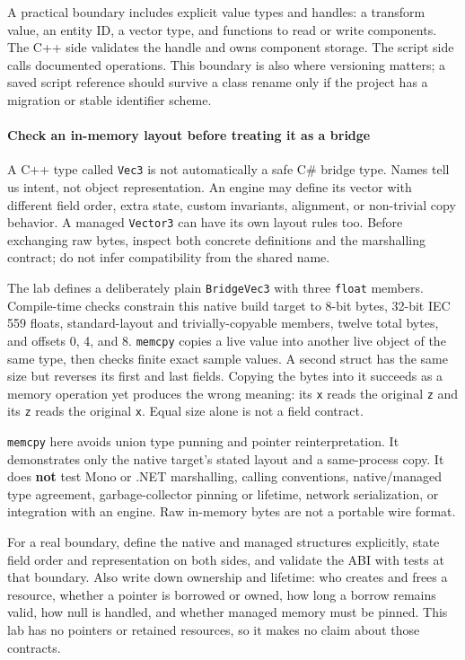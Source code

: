 A practical boundary includes explicit value types and handles: a transform value, an entity ID, a vector type, and functions to read or write components. The C++ side validates the handle and owns component storage. The script side calls documented operations. This boundary is also where versioning matters; a saved script reference should survive a class rename only if the project has a migration or stable identifier scheme.

\paragraph{Check an in-memory layout before treating it as a bridge}\label{06-engine-ii-ch040-check-an-in-memory-layout-before-treating-it-as-a-bridge}

A C++ type called \texttt{Vec3} is not automatically a safe C\# bridge type. Names tell us intent, not object representation. An engine may define its vector with different field order, extra state, custom invariants, alignment, or non-trivial copy behavior. A managed \texttt{Vector3} can have its own layout rules too. Before exchanging raw bytes, inspect both concrete definitions and the marshalling contract; do not infer compatibility from the shared name.

The lab defines a deliberately plain \texttt{BridgeVec3} with three \texttt{float} members. Compile-time checks constrain this native build target to 8-bit bytes, 32-bit IEC 559 floats, standard-layout and trivially-copyable members, twelve total bytes, and offsets 0, 4, and 8. \texttt{memcpy} copies a live value into another live object of the same type, then checks finite exact sample values. A second struct has the same size but reverses its first and last fields. Copying the bytes into it succeeds as a memory operation yet produces the wrong meaning: its \texttt{x} reads the original \texttt{z} and its \texttt{z} reads the original \texttt{x}. Equal size alone is not a field contract.

\texttt{memcpy} here avoids union type punning and pointer reinterpretation. It demonstrates only the native target's stated layout and a same-process copy. It does \textbf{not} test Mono or .NET marshalling, calling conventions, native/managed type agreement, garbage-collector pinning or lifetime, network serialization, or integration with an engine. Raw in-memory bytes are not a portable wire format.

For a real boundary, define the native and managed structures explicitly, state field order and representation on both sides, and validate the ABI with tests at that boundary. Also write down ownership and lifetime: who creates and frees a resource, whether a pointer is borrowed or owned, how long a borrow remains valid, how null is handled, and whether managed memory must be pinned. This lab has no pointers or retained resources, so it makes no claim about those contracts.

